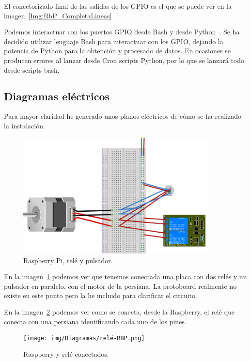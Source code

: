 El conectorizado final de las salidas de los GPIO es el que se puede ver en la imagen~\ref{Img:RbP_CompletaLineas}

Podemos interactuar con los puertos GPIO desde Bash y desde Python~\cite{misc:Python}. Se ha decidido utilizar lenguaje Bash para interactuar con los GPIO, dejando la potencia de Python para la obtención y procesado de datos. En ocasiones se producen errores al lanzar desde Cron scripts Python, por lo que se lanzará todo desde scripts bash.


\subsection{Diagramas eléctricos}
Para mayor claridad he generado unos planos eléctricos de cómo se ha realizado la instalación.

\begin{figure}[h]
    \centering
    \includegraphics[width=0.9\textwidth]{img/Diagramas/rele-pulsador-motor.png}
    \caption{Raspberry Pi, relé y pulsador.} \label{Img:Relé+Pulsador+Rbp_Fritzing}
\end{figure}

En la imagen~\ref{Img:Relé+Pulsador+Rbp_Fritzing} podemos ver que tenemos conectada una placa con dos relés y un pulsador en paralelo, con el motor de la persiana. La protoboard realmente no existe en este punto pero la he incluido para clarificar el circuito.

En la imagen~\ref{Img:Relé+Rbp_Fritzing} podemos ver como se conecta, desde la Raspberry, el relé que conecta con una persiana identificando cada uno de los pines.

\begin{figure}[h]
    \centering
    \texttt{[image: img/Diagramas/relé-RBP.png]}
    \caption{Raspberry y relé conectados.} \label{Img:Relé+Rbp_Fritzing}
\end{figure}

